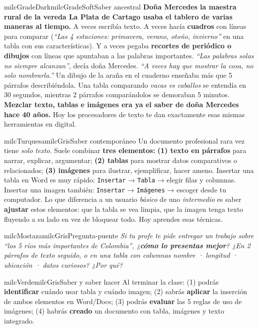 \documentclass[11pt,letterpaper]{article}
\begin{document}
\begin{softbox}{milcGradeDark}{milcGradeSoft}{Saber ancestral}
\textbf{Doña Mercedes la maestra rural de la vereda La Plata de Cartago usaba el tablero de varias maneras al tiempo.} A veces escribía texto. A veces hacía \textbf{cuadros} con líneas para comparar (\emph{``Las 4 estaciones: primavera, verano, otoño, invierno''} en una tabla con sus características). Y a veces pegaba \textbf{recortes de periódico o dibujos} con líneas que apuntaban a las palabras importantes. \emph{``Las palabras solas no siempre alcanzan''}, decía doña Mercedes. \emph{``A veces hay que mostrar la cosa, no solo nombrarla.''} Un dibujo de la araña en el cuaderno enseñaba más que 5 párrafos describiéndola. Una tabla comparando \emph{vacas vs caballos} se entendía en 30 segundos, mientras 2 párrafos comparándolos se demoraban 5 minutos. \textbf{Mezclar texto, tablas e imágenes era ya el saber de doña Mercedes hace 40 años.} Hoy los procesadores de texto te dan exactamente esas mismas herramientas en digital.
\end{softbox}

\begin{softbox}{milcTurquesa}{milcGris}{Saber contemporáneo}
Un documento profesional rara vez tiene \emph{solo texto}. Suele combinar \textbf{tres elementos:} \textbf{(1) texto en párrafos} para narrar, explicar, argumentar; \textbf{(2) tablas} para mostrar datos comparativos o relacionados; \textbf{(3) imágenes} para ilustrar, ejemplificar, hacer ameno. Insertar una tabla en Word es muy rápido: \texttt{Insertar} → \texttt{Tabla} → elegir filas y columnas. Insertar una imagen también: \texttt{Insertar} → \texttt{Imágenes} → escoger desde tu computador. Lo que diferencia a un usuario \emph{básico} de uno \emph{intermedio} es saber \textbf{ajustar} estos elementos: que la tabla se vea limpia, que la imagen tenga texto fluyendo a su lado en vez de bloquear todo. Hoy aprendes esas técnicas.
\end{softbox}

\begin{softbox}{milcMostaza}{milcGris}{Pregunta-puente}
\textit{Si tu profe te pide entregar un trabajo sobre \emph{``los 5 ríos más importantes de Colombia''}, ¿\textbf{cómo lo presentas mejor}? ¿En 2 párrafos de texto seguido, o en una tabla con columnas \emph{nombre · longitud · ubicación · datos curiosos}? ¿Por qué?}
\end{softbox}

\begin{softbox}{milcVerde}{milcGris}{Saber y saber hacer}
Al terminar la clase: (1) podrás \textbf{identificar} cuándo usar tabla y cuándo imagen; (2) sabrás \textbf{aplicar} la inserción de ambos elementos en Word/Docs; (3) podrás \textbf{evaluar} las 5 reglas de uso de imágenes; (4) habrás \textbf{creado} un documento con tabla, imágenes y texto integrado.
\end{softbox}
\end{document}
